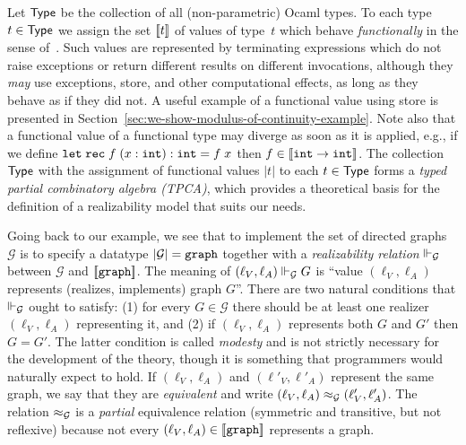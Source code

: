 Let $\mathsf{Type}$ be the collection of all (non-parametric) Ocaml types. To
each type $t \in \mathsf{Type}$ we assign the set $[\![t]\!]$ of values of
type~$t$ which behave \emph{functionally} in the sense
of~\cite{longley99when}. Such values are represented by terminating
expressions which do not raise exceptions or return different results
on different invocations, although they \emph{may} use exceptions,
store, and other computational effects, as long as they behave as if
they did not. A useful example of a functional value using store is
presented in Section~\ref{sec:we-show-modulus-of-continuity-example}.
Note also that a functional value of a functional type may diverge as
soon as it is applied, e.g., if we define
$\mathtt{let}\;\mathtt{rec}\;f\;(x:\mathtt{int}):\mathtt{int} = f\;x$ then $f \in [\![\mathtt{int} \to
  \mathtt{int}]\!]$. The collection $\mathsf{Type}$ with the assignment of functional
values $|t|$ to each $t \in \mathsf{Type}$ forms a \emph{typed partial
  combinatory algebra (TPCA)}, which provides a theoretical basis for
the definition of a realizability model that suits our needs.

Going back to our example, we see that to implement the set of
directed graphs $\mathcal{G}$ is to specify a datatype
$|\mathcal{G}| = \mathtt{graph}$ together with a
\emph{realizability relation} $\Vdash_{\mathcal{G}}$ between
$\mathcal{G}$ and $[\![\mathtt{graph}]\!]$. The meaning of $(\ell_V,
\ell_A) \Vdash_\mathcal{G} G$ is ``value $(\ell_V, \ell_A)$ represents
(realizes, implements) graph $G$''. There are two natural conditions
that $\Vdash_\mathcal{G}$ ought to satisfy: (1) for every $G \in
\mathcal{G}$ there should be at least one realizer $(\ell_V, \ell_A)$
representing it, and (2) if $(\ell_V, \ell_A)$ represents both $G$ and
$G'$ then $G = G'$. The latter condition is called \emph{modesty} and
is not strictly necessary for the development of the theory, though it
is something that programmers would naturally expect to hold. If
$(\ell_V, \ell_A)$ and $(\ell'_V, \ell'_A)$ represent the same graph,
we say that they are \emph{equivalent} and write $(\ell_V, \ell_A)
\approx_\mathcal{G} (\ell'_V, \ell'_A)$. The relation $\approx_\mathcal{G}$
is a \emph{partial} equivalence relation (symmetric and transitive,
but not reflexive) because not every $(\ell_V, \ell_A) \in
[\![\mathtt{graph}]\!]$ represents a graph.

\bigskip

